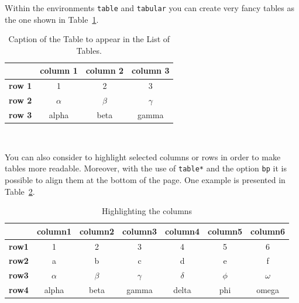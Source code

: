 Within the environments \texttt{table} and  \texttt{tabular} you can create very fancy tables as the one shown in Table~\ref{table:example}.
\begin{table}[H]
    \caption*{\textbf{Title of Table (optional)}}
    \centering 
    \begin{tabular}{|p{3em} c c c |}
    \hline
    \rowcolor{bluepoli!40} %
     & \textbf{column 1} & \textbf{column 2} & \textbf{column 3} \T\B \\
    \hline \hline
    \textbf{row 1} & 1 & 2 & 3 \T\B \\
    \textbf{row 2} & $\alpha$ & $\beta$ & $\gamma$ \T\B\\
    \textbf{row 3} & alpha & beta & gamma \B\\
    \hline
    \end{tabular}
    \\[10pt]
    \caption{Caption of the Table to appear in the List of Tables.}
    \label{table:example}
\end{table}

You can also consider to highlight selected columns or rows in order to make tables more readable.
Moreover, with the use of \texttt{table*} and the option \texttt{bp} it is possible to align them at the bottom of the page. One example is presented in Table~\ref{table:exampleC}. 

\begin{table}[H]
\centering 
    \begin{tabular}{|p{3em} | c | c | c | c | c | c|}
    \hline
     & \textbf{column1} & \textbf{column2} & \textbf{column3} & \textbf{column4} & \textbf{column5} & \textbf{column6} \T\B \\
    \hline \hline
    \textbf{row1} & 1 & 2 & 3 & 4 & 5 & 6 \T\B\\
    \textbf{row2} & a & b & c & d & e & f \T\B\\
    \textbf{row3} & $\alpha$ & $\beta$ & $\gamma$ & $\delta$ & $\phi$ & $\omega$ \T\B\\
    \textbf{row4} & alpha & beta & gamma & delta & phi & omega \B\\
    \hline
    \end{tabular}
    \\[10pt]
    \caption{Highlighting the columns}
    \label{table:exampleC}
\end{table}

